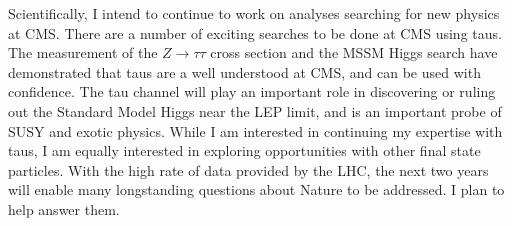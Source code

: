 \documentclass{scrartcl}        %
\begin{document}
\begin{cv}{}
Scientifically, I intend to continue to work on analyses searching for new
physics at CMS\@.  There are a number of exciting searches to be done at CMS
using taus.  The measurement of the $Z\to\tau\tau$ cross section and the MSSM
Higgs search have demonstrated that taus are a well understood at CMS, and can
be used with confidence.  The tau channel will play an important role in
discovering or ruling out the Standard Model Higgs near the LEP limit, and is an
important probe of SUSY and exotic physics. While I am interested in continuing
my expertise with taus, I am equally interested in exploring opportunities with
other final state particles.  With the high rate of data provided by the LHC,
the next two years will enable many longstanding questions about
Nature to be addressed.  I plan to help answer them. 

\end{cv}
\end{document}
